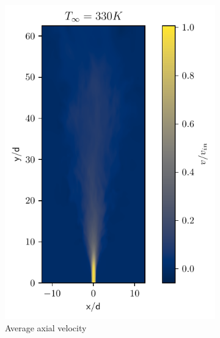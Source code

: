 \begin{figure}[htbp!]
\begin{subfigure}{0.25\textwidth}
	\includegraphics[scale=.65]{figures/Plots/vertical/330/v_scaled_vert_avg_330.pdf}
	\caption{Average axial velocity} \label{330_v_3}
\end{subfigure}
\hfill
\begin{subfigure}{0.25\textwidth}
	\centering

\end{subfigure}
\end{figure}
